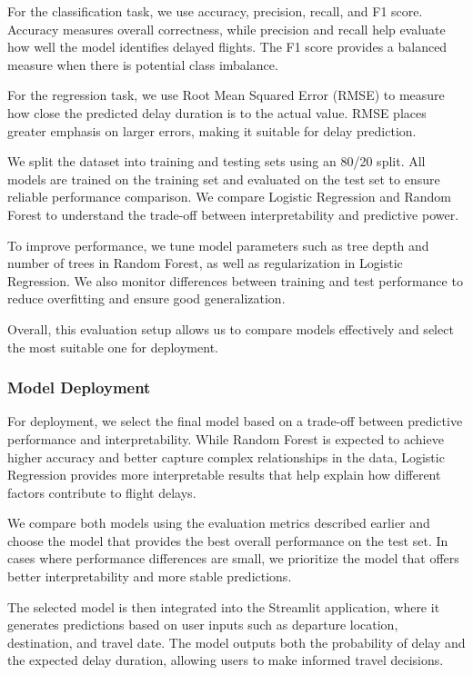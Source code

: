 For the classification task, we use accuracy, precision, recall, and F1 score. Accuracy measures overall correctness, while precision and recall help evaluate how well the model identifies delayed flights. The F1 score provides a balanced measure when there is potential class imbalance.

For the regression task, we use Root Mean Squared Error (RMSE) to measure how close the predicted delay duration is to the actual value. RMSE places greater emphasis on larger errors, making it suitable for delay prediction.

We split the dataset into training and testing sets using an 80/20 split. All models are trained on the training set and evaluated on the test set to ensure reliable performance comparison. We compare Logistic Regression and Random Forest to understand the trade-off between interpretability and predictive power.

To improve performance, we tune model parameters such as tree depth and number of trees in Random Forest, as well as regularization in Logistic Regression. We also monitor differences between training and test performance to reduce overfitting and ensure good generalization.

Overall, this evaluation setup allows us to compare models effectively and select the most suitable one for deployment.

\subsubsection{Model Deployment} 

For deployment, we select the final model based on a trade-off between predictive performance and interpretability. While Random Forest is expected to achieve higher accuracy and better capture complex relationships in the data, Logistic Regression provides more interpretable results that help explain how different factors contribute to flight delays.

We compare both models using the evaluation metrics described earlier and choose the model that provides the best overall performance on the test set. In cases where performance differences are small, we prioritize the model that offers better interpretability and more stable predictions.

The selected model is then integrated into the Streamlit application, where it generates predictions based on user inputs such as departure location, destination, and travel date. The model outputs both the probability of delay and the expected delay duration, allowing users to make informed travel decisions.


